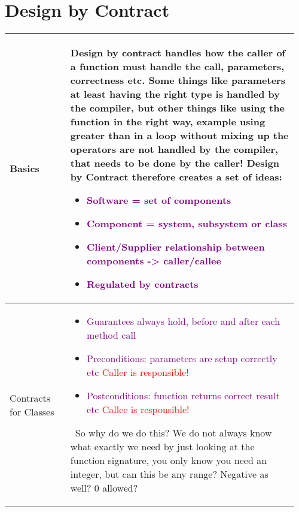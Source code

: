 \documentclass[main.tex,fontsize=8pt,paper=a4,paper=portrait,DIV=calc,]{scrartcl}
\begin{document}
\begin{table}[ht!]
\section{Design by Contract}
\begin{tabular}{|m{0.2\linewidth}|m{0.755\linewidth}|}
\hline
Basics & 
Design by contract handles how the caller of a function must handle the call, parameters, correctness etc.\newline
Some things like parameters at least having the right type is handled by the compiler, but other things like using the function in the right way, example using greater than in a loop without mixing up the operators are not handled by the compiler, that needs to be done by the caller!\newline
Design by Contract therefore creates a set of ideas:\newline
\begin{itemize}
\item \textcolor{purple}{Software = set of components}
\item \textcolor{purple}{Component = system, subsystem or class}
\item \textcolor{purple}{Client/Supplier relationship between components -> caller/callee}
\item \textcolor{purple}{Regulated by contracts}
\vspace{-3mm}
\end{itemize} \\
\hline
Contracts for Classes & 
\vspace{2mm}
\begin{itemize}
\item \textcolor{purple}{Guarantees always hold, before and after each method call}
\item \textcolor{purple}{Preconditions: parameters are setup correctly etc}\newline
  \textcolor{red}{Caller is responsible!}
\item \textcolor{purple}{Postconditions: function returns correct result etc}\newline
  \textcolor{red}{Callee is responsible!}
\vspace{-3mm}
\end{itemize}  
\, \newline
So why do we do this?\newline
We do not always know what exactly we need by just looking at the function signature, you only know you need an integer, but can this be any range? Negative as well? 0 allowed?\newline

\end{tabular}
\end{table}
\end{document}
